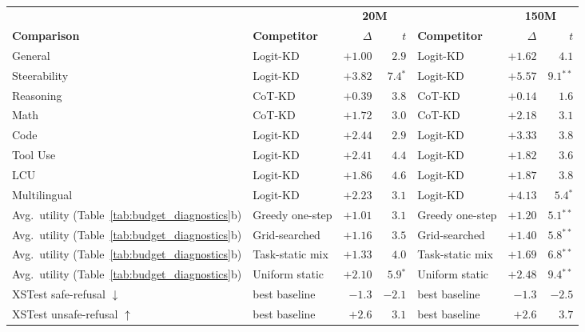 \begin{table}[t]
  \centering
  \caption{}
  \label{tab:signif}
  \renewcommand{\arraystretch}{0.95}
  \begin{tabular}{@{}llrrlrr@{}}
    \toprule
    & & \multicolumn{2}{c}{\textbf{20M}} & & \multicolumn{2}{c}{\textbf{150M}} \\
    \cmidrule(lr){3-4}\cmidrule(lr){6-7}
    \textbf{Comparison} & \textbf{Competitor} & $\Delta$ & $t$ & \textbf{Competitor} & $\Delta$ & $t$ \\
    \midrule
    General & Logit-KD & $+1.00$ & $2.9$ & Logit-KD & $+1.62$ & $4.1$ \\
    Steerability & Logit-KD & $+3.82$ & $7.4$$^{*}$ & Logit-KD & $+5.57$ & $9.1$$^{**}$ \\
    Reasoning & CoT-KD & $+0.39$ & $3.8$ & CoT-KD & $+0.14$ & $1.6$ \\
    Math & CoT-KD & $+1.72$ & $3.0$ & CoT-KD & $+2.18$ & $3.1$ \\
    Code & Logit-KD & $+2.44$ & $2.9$ & Logit-KD & $+3.33$ & $3.8$ \\
    Tool Use & Logit-KD & $+2.41$ & $4.4$ & Logit-KD & $+1.82$ & $3.6$ \\
    LCU & Logit-KD & $+1.86$ & $4.6$ & Logit-KD & $+1.87$ & $3.8$ \\
    Multilingual & Logit-KD & $+2.23$ & $3.1$ & Logit-KD & $+4.13$ & $5.4$$^{*}$ \\
    \midrule
    Avg.\ utility (Table~\ref{tab:budget_diagnostics}b) & Greedy one-step & $+1.01$ & $3.1$ & Greedy one-step & $+1.20$ & $5.1$$^{**}$ \\
    Avg.\ utility (Table~\ref{tab:budget_diagnostics}b) & Grid-searched & $+1.16$ & $3.5$ & Grid-searched & $+1.40$ & $5.8$$^{**}$ \\
    Avg.\ utility (Table~\ref{tab:budget_diagnostics}b) & Task-static mix & $+1.33$ & $4.0$ & Task-static mix & $+1.69$ & $6.8$$^{**}$ \\
    Avg.\ utility (Table~\ref{tab:budget_diagnostics}b) & Uniform static & $+2.10$ & $5.9$$^{*}$ & Uniform static & $+2.48$ & $9.4$$^{**}$ \\
    \midrule
    XSTest safe-refusal $\downarrow$ & best baseline & $-1.3$ & $-2.1$ & best baseline & $-1.3$ & $-2.5$ \\
    XSTest unsafe-refusal $\uparrow$ & best baseline & $+2.6$ & $3.1$ & best baseline & $+2.6$ & $3.7$ \\
    \bottomrule
  \end{tabular}
\end{table}
